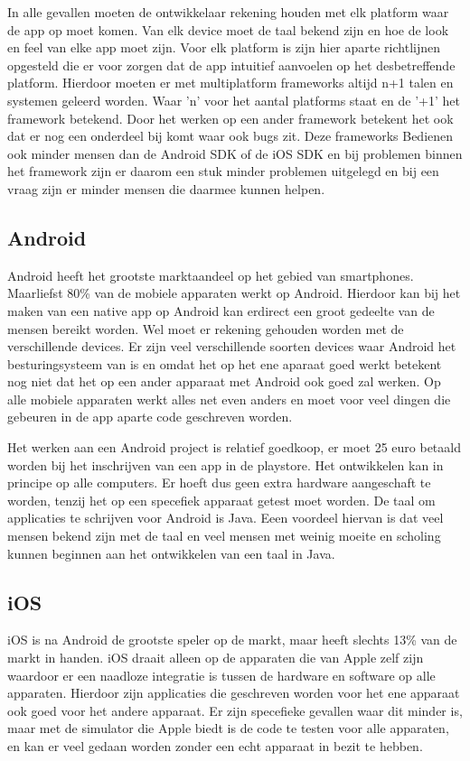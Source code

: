 \documentclass[a4paper,11pt,oneside]{report}
\begin{document}
In alle gevallen moeten de ontwikkelaar rekening houden met elk platform waar de
app op moet komen. Van elk device moet de taal bekend zijn en hoe de look en
feel van elke app moet zijn. Voor elk platform is zijn hier aparte richtlijnen
opgesteld die er voor zorgen dat de app intuitief aanvoelen op het
desbetreffende platform. Hierdoor moeten er met multiplatform frameworks altijd
n+1 talen en systemen geleerd worden. Waar 'n' voor het aantal platforms staat
en de '+1' het framework betekend. Door het werken op een ander framework
betekent het ook dat er nog een onderdeel bij komt waar ook bugs zit. Deze
frameworks Bedienen ook minder mensen dan de Android SDK of de iOS SDK en bij
problemen binnen het framework zijn er daarom een stuk minder problemen
uitgelegd en bij een vraag zijn er minder mensen die daarmee kunnen helpen.

\subsection{Android}
Android heeft het grootste marktaandeel op het gebied van smartphones.
Maarliefst 80\% van de mobiele apparaten werkt op Android. Hierdoor kan bij het
maken van een native app op Android kan erdirect een groot gedeelte van de
mensen bereikt worden. Wel moet er rekening gehouden worden met de verschillende
devices. Er zijn veel verschillende soorten devices waar Android het
besturingsysteem van is en omdat het op het ene aparaat goed werkt betekent nog
niet dat het op een ander apparaat met Android ook goed zal werken. Op alle
mobiele apparaten werkt alles net even anders en moet voor veel dingen die
gebeuren in de app aparte code geschreven worden.

Het werken aan een Android project is relatief goedkoop, er moet 25 euro betaald
worden bij het inschrijven van een app in de playstore. Het ontwikkelen kan in
principe op alle computers. Er hoeft dus geen extra hardware aangeschaft te
worden, tenzij het op een specefiek apparaat getest moet worden. De taal om
applicaties te schrijven voor Android is Java. Eeen voordeel hiervan is dat veel
mensen bekend zijn met de taal en veel mensen met weinig moeite en scholing
kunnen beginnen aan het ontwikkelen van een taal in Java.


\subsection{iOS}
iOS is na Android de grootste speler op de markt, maar heeft slechts 13\% van de
markt in handen. iOS draait alleen op de apparaten die van Apple zelf zijn
waardoor er een naadloze integratie is tussen de hardware en software op alle
apparaten. Hierdoor zijn applicaties die geschreven worden voor het ene apparaat
ook goed voor het andere apparaat. Er zijn specefieke gevallen waar dit minder
is, maar met de simulator die Apple biedt is de code te testen voor alle
apparaten, en kan er veel gedaan worden zonder een echt apparaat in bezit te
hebben.
\end{document}
